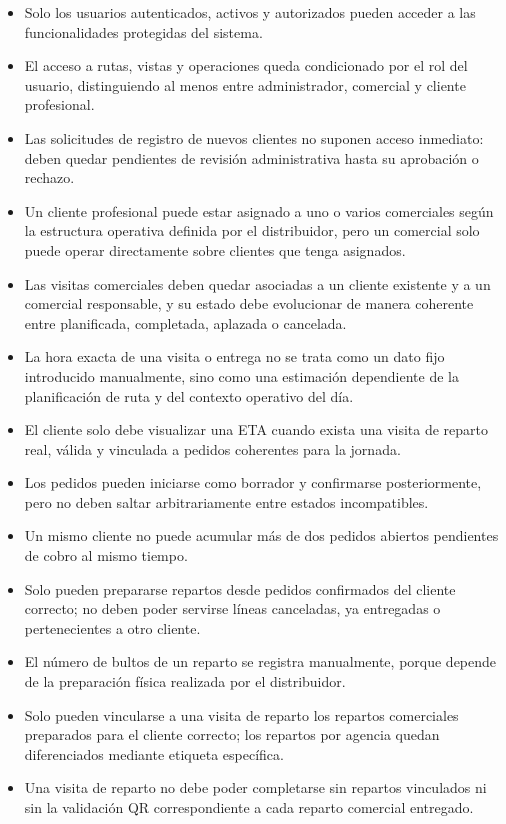 \begin{itemize}
    \item Solo los usuarios autenticados, activos y autorizados pueden acceder a las funcionalidades protegidas del sistema.
    \item El acceso a rutas, vistas y operaciones queda condicionado por el rol del usuario, distinguiendo al menos entre administrador, comercial y cliente profesional.
    \item Las solicitudes de registro de nuevos clientes no suponen acceso inmediato: deben quedar pendientes de revisión administrativa hasta su aprobación o rechazo.
    \item Un cliente profesional puede estar asignado a uno o varios comerciales según la estructura operativa definida por el distribuidor, pero un comercial solo puede operar directamente sobre clientes que tenga asignados.
    \item Las visitas comerciales deben quedar asociadas a un cliente existente y a un comercial responsable, y su estado debe evolucionar de manera coherente entre planificada, completada, aplazada o cancelada.
    \item La hora exacta de una visita o entrega no se trata como un dato fijo introducido manualmente, sino como una estimación dependiente de la planificación de ruta y del contexto operativo del día.
    \item El cliente solo debe visualizar una ETA cuando exista una visita de reparto real, válida y vinculada a pedidos coherentes para la jornada.
    \item Los pedidos pueden iniciarse como borrador y confirmarse posteriormente, pero no deben saltar arbitrariamente entre estados incompatibles.
    \item Un mismo cliente no puede acumular más de dos pedidos abiertos pendientes de cobro al mismo tiempo.
    \item Solo pueden prepararse repartos desde pedidos confirmados del cliente correcto; no deben poder servirse líneas canceladas, ya entregadas o pertenecientes a otro cliente.
    \item El número de bultos de un reparto se registra manualmente, porque depende de la preparación física realizada por el distribuidor.
    \item Solo pueden vincularse a una visita de reparto los repartos comerciales preparados para el cliente correcto; los repartos por agencia quedan diferenciados mediante etiqueta específica.
    \item Una visita de reparto no debe poder completarse sin repartos vinculados ni sin la validación QR correspondiente a cada reparto comercial entregado.

\end{itemize}
